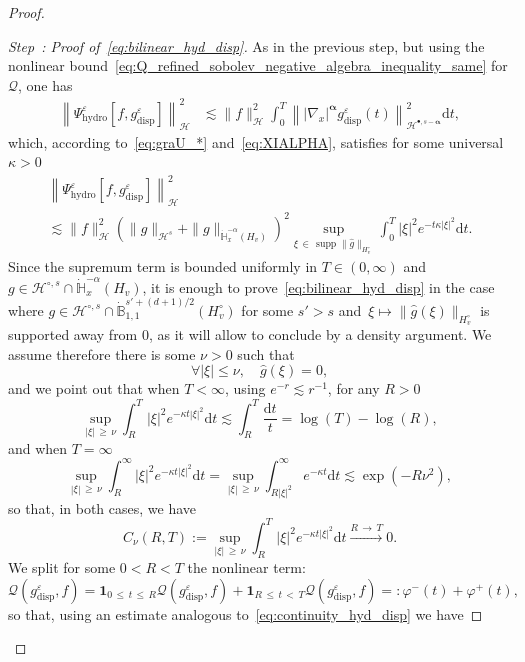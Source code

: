 \documentclass[10pt]{amsart}
\theoremstyle{definition}\newtheorem{defi}[theo]{Definition}\newtheorem{rema}[theo]{Remark}\newtheorem{exam}[theo]{Example}\newtheorem{exem}[theo]{Example}\newtheorem{nota}[theo]{Notation}
\DeclareMathOperator{\supp}{supp}
\newcommand{\hyd}{\mathrm{hydro}}
\renewcommand{\d}{\mathrm{d}}
\newcommand{\disp}{\mathrm{disp}}
\newcommand{\Burin}{\mathbf{1}}
\newcommand{\bbH}{\mathbb{H}}
\newcommand{\bbB}{\mathbb{B}}
\newcommand{\HH}{\mathcal{H}}
\newcommand{\QQ}{\mathcal{Q}}
\newcommand{\HHH}{\mathscr{H}}
\newcommand{\Ss}{H}
\newcommand{\Ssm}{H^{\circ}}
\newcommand{\rSSs}[1]{\HH^{#1}}
\newcommand{\rSSsp}[1]{\HH^{{\bullet}, #1}}
\newcommand{\rSSsm}[1]{\HH^{{\circ}, #1}}
\newcommand{\SSSs}{\HHH}
\renewcommand*\le{\leqslant}
\renewcommand*\ge{\geqslant}
\newcommand*\eps{{\varepsilon}}
\newcounter{stepcount}
\newenvironment{step}[1]{\refstepcounter{stepcount}\begin{proof}[Step~\thestepcount: #1]}{\let\qed\relax\end{proof}}
\let\oldforall\forall
\renewcommand*{\forall}{\mathrel{\oldforall}}
\begin{document}
\begin{proof}
\begin{step}{{Proof of~\eqref{eq:bilinear_hyd_disp}}}\label{prfprop5.4step2}
As in the previous step, but using the nonlinear bound~\eqref{eq:Q_refined_sobolev_negative_algebra_inequality_same} for $\QQ$, one has
\begin{align*}
\left\| \Psi^\eps_\hyd\left[f, g^\eps_\disp\right] \right\|^2_\SSSs & \lesssim \| f \|_{ \SSSs}^2 \int_0^T \left\| | \nabla_{x} |^{\boldsymbol{\alpha}} g^\eps_\disp(t) \right\|^2_{ \rSSsp{s-{\boldsymbol{\alpha}}} } \d t,
\end{align*}
which, according to~\eqref{eq:graU_*} and~\eqref{eq:XIALPHA}, satisfies for some universal $\kappa > 0$
\begin{multline}\label{eq:continuity_hyd_disp}
\left\| \Psi^\eps_\hyd\left[f, g^\eps_\disp\right] \right\|^2_\SSSs \\
\lesssim \| f \|_{ \SSSs}^2 \left(\| g \|_{ \rSSs{s} } + \| g \|_{ \dot{\bbH}^{-\alpha}_x \left(\Ss_v \right) } \right)^2 \sup_{\xi\,\in\,\supp \| \widehat{g} \|_{\Ssm_v} } \int_0^T | \xi |^2 e^{-t \kappa | \xi |^2 } \d t.
\end{multline}
Since the supremum term is bounded uniformly in $T \in (0, \infty)$ and $g \in \rSSsm{s} \cap \dot{\bbH}^{-\alpha}_x (\Ss_v)$, it is enough to prove~\eqref{eq:bilinear_hyd_disp} in the case where $g \in \rSSsm{s} \cap \dot{\bbB}^{s' + (d+1)/2 }_{1, 1} (\Ssm_v)$ for some $s' > s$ and~$\xi \mapsto \| \widehat{g}(\xi) \|_{ \Ssm_v }$ is supported away from $0$, as it will allow to conclude by a density argument. We assume therefore there is some $\nu > 0$ such that
\[
\forall | \xi | \le \nu, \quad \widehat{g}(\xi) = 0,
\]
and we point out that when $T < \infty$, using $e^{-r} \lesssim r^{-1}$, for any $R > 0$
\[
\sup_{|\xi |\,\ge\,\nu} \int_R^T | \xi|^2 e^{-\kappa t | \xi |^2} \d t \lesssim \int_{ R }^{ T } \frac{\d t}{t} = \log(T) - \log(R),
\]
and when $T = \infty$
\[
\sup_{|\xi |\,\ge\,\nu} \int_R^\infty | \xi|^2 e^{-\kappa t | \xi |^2} \d t = \sup_{|\xi |\,\ge\,\nu } \int_{ R | \xi |^2 }^\infty e^{- \kappa t } \d t \lesssim \exp\left(- R \nu^2 \right),
\]
so that, in both cases, we have
\[
C_\nu(R, T) := \sup_{|\xi |\,\ge\,\nu} \int_R^T | \xi|^2 e^{-\kappa t | \xi |^2} \d t \xrightarrow[]{R\,\to\,T} 0.
\]
We split for some $0 < R < T$ the nonlinear term:
\[
\QQ\left(g^\eps_\disp, f\right) = \Burin_{0\,\le\,t\,\le\,R} \QQ\left(g^\eps_\disp, f\right) + \Burin_{R\,\le\,t\,<\,T} \QQ\left(g^\eps_\disp, f\right) =: \varphi^-(t) + \varphi^+(t),
\]
so that, using an estimate analogous to~\eqref{eq:continuity_hyd_disp} we have

\end{step}
\end{proof}
\end{document}
